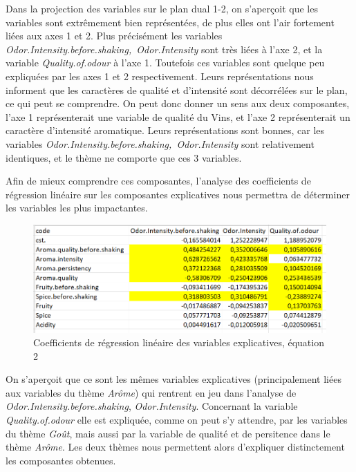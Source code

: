 \documentclass[a4paper,french,10pt]{article}
\begin{document}
Dans la projection des variables sur le plan dual 1-2, on s'aperçoit que les variables sont extrêmement bien représentées, de plus elles ont l'air fortement liées aux axes 1 et 2. Plus précisément les variables \textit{Odor.Intensity.before.shaking,~Odor.Intensity} sont très liées à l'axe 2, et la variable \textit{Quality.of.odour} à l'axe 1. Toutefois ces variables sont quelque peu expliquées par les axes 1 et 2 respectivement. 
Leurs représentations nous informent que les caractères de qualité et d'intensité sont décorrélées sur le plan, ce qui peut se comprendre.
On peut donc donner un sens aux deux composantes, l'axe 1 représenterait une variable de qualité du Vins, et l'axe 2 représenterait un caractère d'intensité aromatique. \newline
Leurs représentations sont bonnes, car les variables \textit{Odor.Intensity.before.shaking,~Odor.Intensity} sont relativement identiques, et le thème ne comporte que ces 3 variables.

Afin de mieux comprendre ces composantes, l'analyse des coefficients de régression linéaire sur les composantes explicatives nous permettra de déterminer les variables les plus impactantes. \newline

\begin{figure}[htp] 
	\centering
	\includegraphics[scale=0.45]{images/Coeff_var_Eq2.png}
	\caption{Coefficients de régression linéaire des variables explicatives, équation 2}
\end{figure}


On s'aperçoit que ce sont les mêmes variables explicatives (principalement liées aux variables du thème \textit{Arôme}) qui rentrent en jeu dans l'analyse de \textit{Odor.Intensity.before.shaking}, \textit{Odor.Intensity}. Concernant la variable \textit{Quality.of.odour} elle est expliquée, comme on peut s'y attendre, par les variables du thème \textit{Goût}, mais aussi par la variable de qualité et de persitence dans le thème \textit{Arôme}. Les deux thèmes nous permettent alors d'expliquer distinctement les composantes obtenues. \newline
\end{document}
